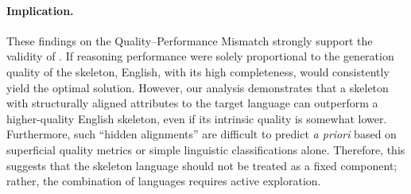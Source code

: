 \paragraph{Implication.} These findings on the Quality--Performance Mismatch strongly support the validity of \Lasef. If reasoning performance were solely proportional to the generation quality of the skeleton, English, with its high completeness, would consistently yield the optimal solution. However, our analysis demonstrates that a skeleton with structurally aligned attributes to the target language can outperform a higher-quality English skeleton, even if its intrinsic quality is somewhat lower. Furthermore, such ``hidden alignments'' are difficult to predict \textit{a priori} based on superficial quality metrics or simple linguistic classifications alone. Therefore, this suggests that the skeleton language should not be treated as a fixed component; rather, the combination of languages requires active exploration.